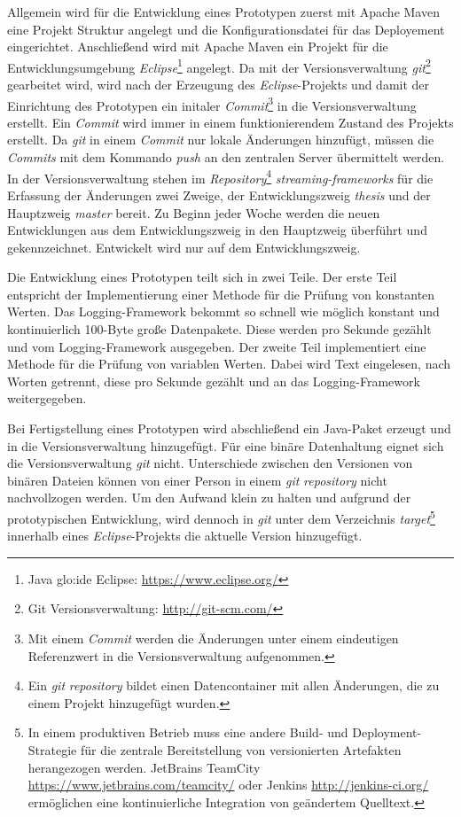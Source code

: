 Allgemein wird für die Entwicklung eines Prototypen zuerst mit Apache Maven eine Projekt Struktur angelegt und die Konfigurationsdatei für das Deployement eingerichtet. Anschließend wird mit Apache Maven ein Projekt für die Entwicklungsumgebung \textit{Eclipse}\footnote{Java \gls{glo:ide} Eclipse: \url{https://www.eclipse.org/}} angelegt. Da mit der Versionsverwaltung \textit{git}\footnote{Git Versionsverwaltung: \url{http://git-scm.com/}} gearbeitet wird, wird nach der Erzeugung des \textit{Eclipse}-Projekts und damit der Einrichtung des Prototypen ein initaler \textit{Commit}\footnote{Mit einem \textit{Commit} werden die Änderungen unter einem eindeutigen Referenzwert in die Versionsverwaltung aufgenommen.} in die Versionsverwaltung erstellt. Ein \textit{Commit} wird immer in einem funktionierendem Zustand des Projekts erstellt. Da \textit{git} in einem \textit{Commit} nur lokale Änderungen hinzufügt, müssen die \textit{Commits} mit dem Kommando \textit{push} an den zentralen Server übermittelt werden. In der Versionsverwaltung stehen im \textit{Repository}\footnote{Ein \textit{git} \textit{repository} bildet einen Datencontainer mit allen Änderungen, die zu einem Projekt hinzugefügt wurden.} \textit{streaming-frameworks} für die Erfassung der Änderungen zwei Zweige, der Entwicklungszweig \textit{thesis} und der Hauptzweig \textit{master} bereit. Zu Beginn jeder Woche werden die neuen Entwicklungen aus dem Entwicklungszweig in den Hauptzweig überführt und gekennzeichnet. Entwickelt wird nur auf dem Entwicklungszweig.

Die Entwicklung eines Prototypen teilt sich in zwei Teile. Der erste Teil entspricht der Implementierung einer Methode für die Prüfung von konstanten Werten. Das Logging-Framework bekommt so schnell wie möglich konstant und kontinuierlich 100-Byte große Datenpakete. Diese werden pro Sekunde gezählt und vom Logging-Framework ausgegeben. Der zweite Teil implementiert eine Methode für die Prüfung von variablen Werten. Dabei wird Text eingelesen, nach Worten getrennt, diese pro Sekunde gezählt und an das Logging-Framework weitergegeben.

Bei Fertigstellung eines Prototypen wird abschließend ein Java-Paket erzeugt und in die Versionsverwaltung hinzugefügt. Für eine binäre Datenhaltung eignet sich die Versionsverwaltung \textit{git} nicht. Unterschiede zwischen den Versionen von binären Dateien können von einer Person in einem \textit{git} \textit{repository} nicht nachvollzogen werden. Um den Aufwand klein zu halten und aufgrund der prototypischen Entwicklung, wird dennoch in \textit{git} unter dem Verzeichnis \textit{target}\footnote{In einem produktiven Betrieb muss eine andere Build- und Deployment-Strategie für die zentrale Bereitstellung von versionierten Artefakten herangezogen werden. JetBrains TeamCity \url{https://www.jetbrains.com/teamcity/} oder Jenkins \url{http://jenkins-ci.org/} ermöglichen eine kontinuierliche Integration von geändertem Quelltext.} innerhalb eines \textit{Eclipse}-Projekts die aktuelle Version hinzugefügt. 

